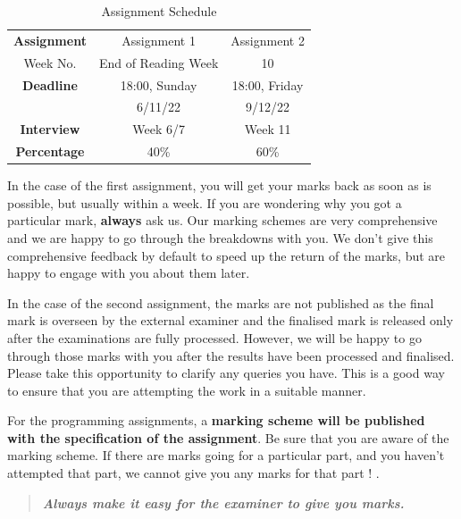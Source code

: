 \documentclass{article}
\begin{document}
  
    \begin{table}
        \begin{center}
    \begin{tabular}{|c |  c  | c | }
    \hline
   
     \rowcolor{red!60}
     \textbf{Assignment}& Assignment 1  & Assignment 2  \\  
     \rowcolor{red!30}
     Week No. & End of Reading Week &  10   \\ 
      \hline
    
     \rowcolor{red!30}
     \hline
     \textbf{Deadline} & 18:00, Sunday &  18:00, Friday  \\ 
 
     \rowcolor{red!30}
    &  6/11/22& 9/12/22  \\ 
     \hline
     \rowcolor{red!10}
     \textbf{Interview} &Week 6/7& Week 11 \\ 
     \hline
     \rowcolor{red!40}
     \textbf{Percentage} &  40\% & 60\%  \\ 
     \hline
 
  
    \end{tabular}
    \caption{Assignment Schedule}
    \label{tab:ass-schedule}   
\end{center}
\end{table}




In the case of the first assignment, you will get your marks back as soon as is possible, but usually within a week. 
If you are wondering why you got a particular mark, \textbf{always} ask us. Our marking schemes are very comprehensive and 
we are happy to go through the breakdowns with you. 
We don't give this comprehensive feedback by default to speed up the return of the marks, but are happy to engage with you  about them later. 

In the case of the second assignment, the marks are not published as the final mark is overseen by the external examiner and the 
finalised mark is released only after the examinations are fully processed. However, we will be happy to go through those marks with you 
after the results have been processed and finalised. Please take this opportunity to clarify any queries you have. This is a good way to ensure that 
you are attempting the work in a suitable manner.


For the programming assignments, a \textbf{marking scheme will be published with the specification of the assignment}. Be sure that you are aware of the marking scheme. 
If there are marks going for a particular part, and you haven't attempted that part, we cannot give you any marks for that part ! . 
\begin{quote}
 \textbf{\textit{Always make it easy for the examiner to give you marks.}}
\end{quote}
\end{document}
